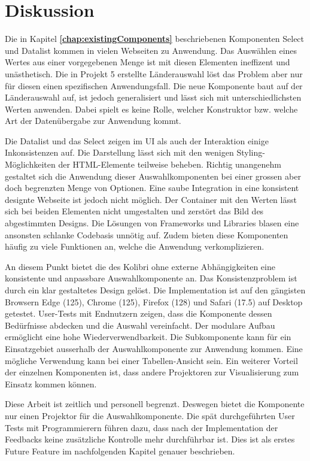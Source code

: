 \chapter{Diskussion}
\label{chap:discussion}

Die in Kapitel \textbf{\ref{chap:existingComponents}} beschriebenen Komponenten Select und Datalist kommen in vielen Webseiten zu Anwendung.
Das Auswählen eines Wertes aus einer vorgegebenen Menge ist mit diesen Elementen ineffizent und unästhetisch.
Die in Projekt 5 erstellte Länderauswahl löst das Problem aber nur für diesen einen spezifischen Anwendungsfall.
Die neue Komponente  baut auf der Länderauswahl auf, ist jedoch generalisiert und lässt sich mit unterschiedlichsten Werten anwenden.
Dabei spielt es keine Rolle, welcher Konstruktor bzw. welche Art der Datenübergabe zur Anwendung kommt. 

Die Datalist und das Select zeigen im UI als auch der Interaktion einige Inkonsistenzen auf.
Die Darstellung lässt sich mit den wenigen Styling-Möglichkeiten der HTML-Elemente teilweise beheben.
Richtig unangenehm gestaltet sich die Anwendung dieser Auswahlkomponenten bei einer grossen aber doch begrenzten Menge von Optionen.
Eine saube Integration in eine konsistent designte Webseite ist jedoch nicht möglich.
Der Container mit den Werten lässt sich bei beiden Elementen nicht umgestalten und zerstört das Bild des abgestimmten Designs.
Die Lösungen von Frameworks und Libraries blasen eine ansonsten schlanke Codebasis unnötig auf.
Zudem bieten diese Komponenten häufig zu viele Funktionen an, welche die Anwendung verkomplizieren. 

An diesem Punkt bietet die  des Kolibri ohne externe Abhängigkeiten eine konsistente und anpassbare Auswahlkomponente an.
Das Konsistenzproblem ist durch ein klar gestaltetes Design gelöst.
Die Implementation ist auf den gängisten Browsern Edge (125), Chrome (125), Firefox (128) und Safari (17.5) auf Desktop getestet.
User-Tests mit Endnutzern zeigen, dass die Komponente dessen Bedürfnisse abdecken und die Auswahl vereinfacht.
Der modulare Aufbau ermöglicht eine hohe Wiederverwendbarkeit.
Die Subkomponente  kann für ein Einsatzgebiet ausserhalb der Auswahlkomponente zur Anwendung kommen.
Eine mögliche Verwendung kann bei einer Tabellen-Ansicht sein.
Ein weiterer Vorteil der einzelnen Komponenten ist, dass andere Projektoren zur Visualisierung zum Einsatz kommen können.

Diese Arbeit ist zeitlich und personell begrenzt.
Deswegen bietet die Komponente nur einen Projektor für die Auswahlkomponente.
Die spät durchgeführten User Tests mit Programmierern führen dazu, dass nach der Implementation der Feedbacks keine zusätzliche Kontrolle mehr durchführbar ist.
Dies ist als erstes Future Feature im nachfolgenden Kapitel genauer beschrieben.


